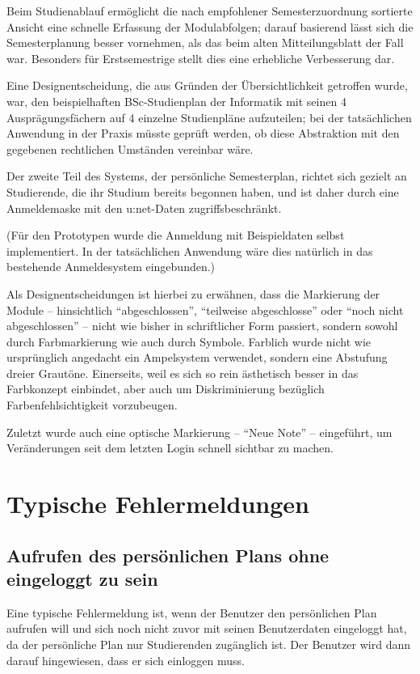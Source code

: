 \documentclass[a4paper,10pt]{scrartcl}
\begin{document}
Beim Studienablauf ermöglicht die nach empfohlener Semesterzuordnung sortierte Ansicht eine schnelle Erfassung der Modulabfolgen; darauf basierend lässt sich die Semesterplanung besser vornehmen, als das beim alten Mitteilungsblatt der Fall war. Besonders für Erstsemestrige stellt dies eine erhebliche Verbesserung dar.

Eine Designentscheidung, die aus Gründen der Übersichtlichkeit getroffen wurde, war, den beispielhaften BSc-Studienplan der Informatik mit seinen 4 Ausprägungsfächern auf 4 einzelne Studienpläne aufzuteilen; bei der tatsächlichen Anwendung in der Praxis müsste geprüft werden, ob diese Abstraktion mit den gegebenen rechtlichen Umständen vereinbar wäre.

Der zweite Teil des Systems, der persönliche Semesterplan, richtet sich gezielt an Studierende, die ihr Studium bereits begonnen haben, und ist daher durch eine Anmeldemaske mit den u:net-Daten zugriffsbeschränkt.

(Für den Prototypen wurde die Anmeldung mit Beispieldaten selbst implementiert. In der tatsächlichen Anwendung wäre dies natürlich in das bestehende Anmeldesystem eingebunden.)

Als Designentscheidungen ist hierbei zu erwähnen, dass die Markierung der Module – hinsichtlich ``abgeschlossen'', ``teilweise abgeschlosse'' oder ``noch nicht abgeschlossen'' – nicht wie bisher in schriftlicher Form passiert, sondern sowohl durch Farbmarkierung wie auch durch Symbole. Farblich wurde nicht wie ursprünglich angedacht ein Ampelsystem verwendet, sondern eine Abstufung dreier Grautöne. Einerseits, weil es sich so rein ästhetisch besser in das Farbkonzept einbindet, aber auch um Diskriminierung bezüglich Farbenfehlsichtigkeit vorzubeugen.

Zuletzt wurde auch eine optische Markierung – ``Neue Note'' – eingeführt, um Veränderungen seit dem letzten Login schnell sichtbar zu machen.

\section{Typische Fehlermeldungen}

\subsection{Aufrufen des persönlichen Plans ohne eingeloggt zu sein}

Eine typische Fehlermeldung ist, wenn der Benutzer den persönlichen Plan aufrufen will und sich noch nicht zuvor mit seinen Benutzerdaten eingeloggt hat,
da der persönliche Plan nur Studierenden zugänglich ist. Der Benutzer wird dann darauf hingewiesen, dass er sich einloggen muss.
\end{document}
